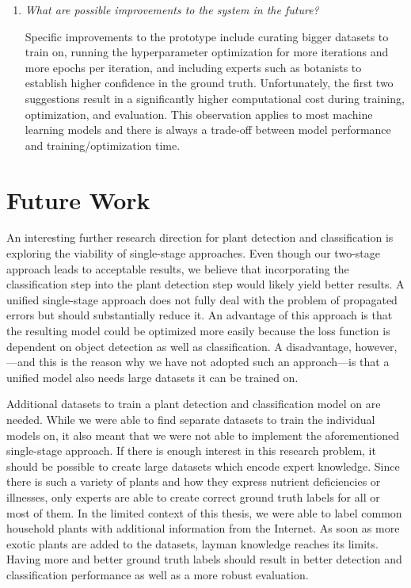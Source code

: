 \documentclass[final]{vutinfth} %
\begin{document}
\begin{enumerate}
\item \emph{What are possible improvements to the system in the
    future?}

  Specific improvements to the prototype include curating bigger
  datasets to train on, running the hyperparameter optimization for
  more iterations and more epochs per iteration, and including experts
  such as botanists to establish higher confidence in the ground
  truth. Unfortunately, the first two suggestions result in a
  significantly higher computational cost during training,
  optimization, and evaluation. This observation applies to most
  machine learning models and there is always a trade-off between
  model performance and training/optimization time.
\end{enumerate}

\section{Future Work}
\label{sec:future-work}

An interesting further research direction for plant detection and
classification is exploring the viability of single-stage
approaches. Even though our two-stage approach leads to acceptable
results, we believe that incorporating the classification step into
the plant detection step would likely yield better results. A unified
single-stage approach does not fully deal with the problem of
propagated errors but should substantially reduce it. An advantage of
this approach is that the resulting model could be optimized more
easily because the loss function is dependent on object detection as
well as classification. A disadvantage, however,—and this is the
reason why we have not adopted such an approach—is that a unified
model also needs large datasets it can be trained on.

Additional datasets to train a plant detection and classification
model on are needed. While we were able to find separate datasets to
train the individual models on, it also meant that we were not able to
implement the aforementioned single-stage approach. If there is enough
interest in this research problem, it should be possible to create
large datasets which encode expert knowledge. Since there is such a
variety of plants and how they express nutrient deficiencies or
illnesses, only experts are able to create correct ground truth labels
for all or most of them. In the limited context of this thesis, we
were able to label common household plants with additional information
from the Internet. As soon as more exotic plants are added to the
datasets, layman knowledge reaches its limits. Having more and better
ground truth labels should result in better detection and
classification performance as well as a more robust evaluation.
\end{document}
